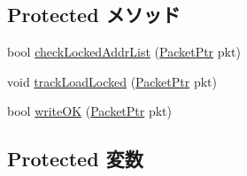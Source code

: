 \subsection*{Protected メソッド}
\begin{DoxyCompactItemize}
\item 
bool \hyperlink{classAbstractMemory_af088ed7a675d24827a3300bdbc62e96a}{checkLockedAddrList} (\hyperlink{classPacket}{PacketPtr} pkt)
\item 
void \hyperlink{classAbstractMemory_ad317aec11d97a72993e653755fa1c003}{trackLoadLocked} (\hyperlink{classPacket}{PacketPtr} pkt)
\item 
bool \hyperlink{classAbstractMemory_ab1136219a28374092ad398d673bd23e0}{writeOK} (\hyperlink{classPacket}{PacketPtr} pkt)
\end{DoxyCompactItemize}
\subsection*{Protected 変数}
